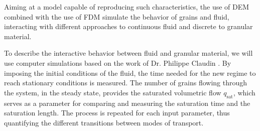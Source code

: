 
    Aiming at a model capable of reproducing such characteristics, the use of DEM combined with the use of FDM simulate the behavior of grains and fluid, interacting with different approaches to continuous fluid and discrete to granular material. 


    To describe the interactive behavior between fluid and granular material, we will use computer simulations based on the work of Dr. Philippe Claudin \cite{Numerical_simulation_of_turbulent_sediment_transport, Sand_ripples_and_dunes, Direct_numerical_simulations_of_aeolian_sand_ripples}. By imposing the initial conditions of the fluid, the time needed for the new regime to reach stationary conditions is measured. The number of grains flowing through the system, in the steady state, provides the saturated volumetric flow $q_\textrm{sat}$, which serves as a parameter for comparing and measuring the saturation time and the saturation length. The process is repeated for each input parameter, thus quantifying the different transitions between modes of transport.


